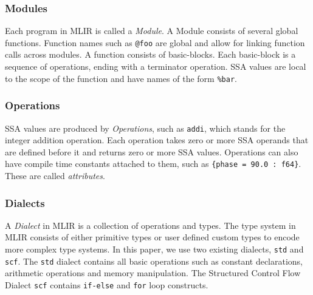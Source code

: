 \documentclass[conference]{IEEEtran}
\begin{document}
\subsubsection{Modules}
Each program in MLIR is called a \emph{Module}. A Module consists of several
global functions. Function names such as \texttt{@foo} are global and allow
for linking function calls across modules. A function consists of basic-blocks. Each
basic-block is a sequence of operations, ending with a terminator operation.
SSA values are local to the scope of the function and have
names of the form \texttt{\%bar}.

\subsubsection{Operations}
SSA values are produced by \emph{Operations}, such as \texttt{addi}, which
stands for the integer addition operation. Each operation takes zero or more
SSA operands that are defined before it and returns zero or more SSA values.
Operations can also have compile time constants attached to them, such as
\texttt{\{phase = 90.0 : f64\}}. These are called \emph{attributes}.
\subsubsection{Dialects}
A \emph{Dialect} in MLIR is a collection of operations and types. The type
system in MLIR consists of either primitive types or user defined custom types to encode
more complex type systems. In this paper, we use two existing dialects, \texttt{std} and \texttt{scf}.
The \texttt{std} dialect contains all basic operations such as constant
declarations, arithmetic operations and memory manipulation. The Structured
Control Flow Dialect \texttt{scf} contains \texttt{if-else} and \texttt{for}
loop constructs.
\end{document}
